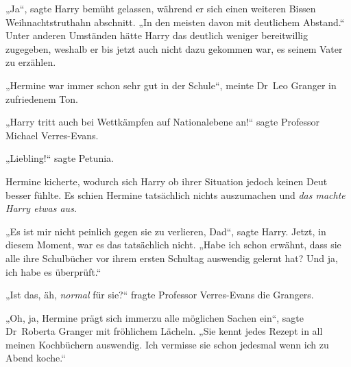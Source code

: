 „Ja“, sagte Harry bemüht gelassen, während er sich einen weiteren Bissen Weihnachtstruthahn abschnitt. „In den meisten davon mit deutlichem Abstand.“ Unter anderen Umständen hätte Harry das deutlich weniger bereitwillig zugegeben, weshalb er bis jetzt auch nicht dazu gekommen war, es seinem Vater zu erzählen.

„Hermine war immer schon sehr gut in der Schule“, meinte Dr~Leo Granger in zufriedenem Ton.

„Harry tritt auch bei Wettkämpfen auf Nationalebene an!“ sagte Professor Michael Verres-Evans.

„Liebling!“ sagte Petunia.

Hermine kicherte, wodurch sich Harry ob ihrer Situation jedoch keinen Deut besser fühlte. Es schien Hermine tatsächlich nichts auszumachen und \emph{das machte Harry etwas aus.}

„Es ist mir nicht peinlich gegen sie zu verlieren, Dad“, sagte Harry. Jetzt, in diesem Moment, war es das tatsächlich nicht. „Habe ich schon erwähnt, dass sie alle ihre Schulbücher vor ihrem ersten Schultag auswendig gelernt hat? Und ja, ich habe es überprüft.“

„Ist das, äh, \emph{normal} für sie?“ fragte Professor Verres-Evans die Grangers.

„Oh, ja, Hermine prägt sich immerzu alle möglichen Sachen ein“, sagte Dr~Roberta Granger mit fröhlichem Lächeln. „Sie kennt jedes Rezept in all meinen Kochbüchern auswendig. Ich vermisse sie schon jedesmal wenn ich zu Abend koche.“

